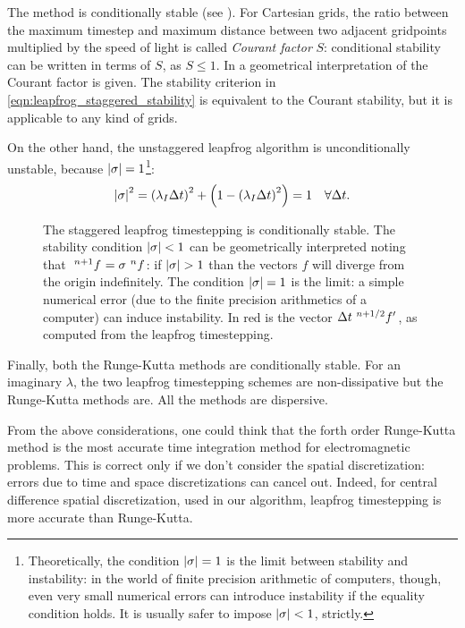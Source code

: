 The method is conditionally stable (see
). For Cartesian grids, the ratio
between the maximum timestep and maximum distance between two
adjacent gridpoints multiplied by the speed of light is called
\emph{Courant factor} $S$: conditional stability can be written in
terms of $S$, as $S \leq 1$. In  a geometrical
interpretation of the Courant factor is given. The stability criterion
in \eqref{eqn:leapfrog_staggered_stability} is equivalent to the
Courant stability, but it is applicable to any kind of grids.

On the other hand, the unstaggered leapfrog algorithm is
unconditionally unstable, because $\Abs{\sigma} =
1$\footnote{Theoretically, the condition $\Abs{\sigma} = 1$ is the limit
between stability and instability: in the world of finite precision
arithmetic of computers, though, even very small numerical errors can
introduce instability if the equality condition holds. It is usually
safer to impose $\Abs{\sigma} < 1$, strictly.}:
\begin{equation*}
  \Abs{\sigma}^2 = \left( \lambda_I \deltat \right)^2 + \left( 1 -
  \left( \lambda_I \deltat \right)^2 \right) = 1 \quad \forall
  \deltat .
\end{equation*}

\begin{figure}[htbp]
  \begin{center}
    \resizebox{6cm}{!}{}
  \end{center}
  \caption{The staggered leapfrog timestepping is conditionally
    stable. The stability condition $\Abs{\sigma} < 1$ can be
    geometrically interpreted noting that $\Disc{f}{}{n+1} = \sigma
    \Disc{f}{}{n}$: if $\Abs{\sigma} > 1$ than the vectors $f$ will
    diverge from the origin indefinitely. The condition $\Abs{\sigma}
    = 1$ is the limit: a simple numerical error (due to the finite
    precision arithmetics of a computer) can induce instability. In
    red is the vector $\deltat \Disc{f'}{}{n+1/2}$, as computed from
    the leapfrog timestepping.}
  \label{fig:liu_fourier_myfig}
\end{figure}

Finally, both the Runge-Kutta methods are conditionally stable. For an imaginary
$\lambda$, the two leapfrog timestepping schemes are non-dis\-si\-pa\-ti\-ve
but the Runge-Kutta methods are. All the methods are dispersive.

From the above considerations, one could think that the forth order
Runge-Kutta method is the most accurate time integration method for
electromagnetic problems. This is correct only if we don't consider
the spatial discretization: errors due to time and space
discretizations can cancel out. Indeed, for central difference spatial
discretization, used in our algorithm, leapfrog timestepping is more
accurate than Runge-Kutta.

